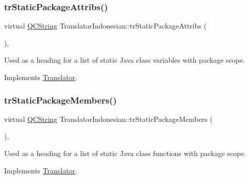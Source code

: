 \mbox{\label{class_translator_indonesian_a5bb6fc9c8cdf321c65be11655465ce28}} 
\subsubsection{\texorpdfstring{trStaticPackageAttribs()}{trStaticPackageAttribs()}}
{\footnotesize\ttfamily virtual \mbox{\hyperlink{class_q_c_string}{Q\+C\+String}} Translator\+Indonesian\+::tr\+Static\+Package\+Attribs (\begin{DoxyParamCaption}{ }\end{DoxyParamCaption})\hspace{0.3cm}{\ttfamily [inline]}, {\ttfamily [virtual]}}

Used as a heading for a list of static Java class variables with package scope. 

Implements \mbox{\hyperlink{class_translator}{Translator}}.

\mbox{\label{class_translator_indonesian_a83c780b02a0e650a88d7a0ded5a2e06e}} 
\subsubsection{\texorpdfstring{trStaticPackageMembers()}{trStaticPackageMembers()}}
{\footnotesize\ttfamily virtual \mbox{\hyperlink{class_q_c_string}{Q\+C\+String}} Translator\+Indonesian\+::tr\+Static\+Package\+Members (\begin{DoxyParamCaption}{ }\end{DoxyParamCaption})\hspace{0.3cm}{\ttfamily [inline]}, {\ttfamily [virtual]}}

Used as a heading for a list of static Java class functions with package scope. 

Implements \mbox{\hyperlink{class_translator}{Translator}}.

\mbox{\label{class_translator_indonesian_ae8875ef0278fe1e7db96cf0c3257a181}} 
